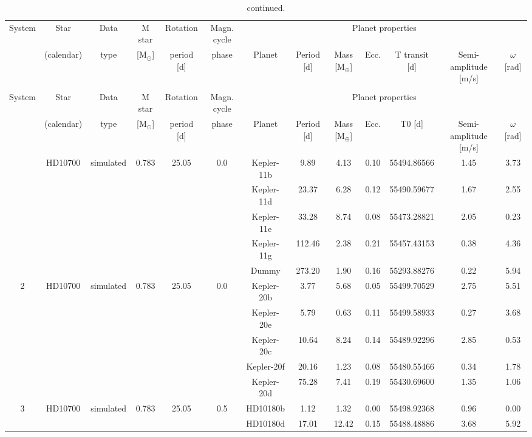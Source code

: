 \documentclass{article}
\begin{document}
	
\begin{landscape}

\begin{longtable}{ccccccccccccc}
\caption{\label{data} Properties of the data set of the  RV fitting challenge.}\\
\hline\hline
System & Star & Data & M star & Rotation & Magn. cycle & \multicolumn{7}{c}{Planet properties} \\
 & (calendar) & type & [M$_{\odot}$] & period [d] & phase & Planet & Period [d] & Mass [M$_{\oplus}$] & Ecc. & T transit [d] & Semi-amplitude [m/s] & $\omega$ [rad]  \\
\hline
\endfirsthead
\caption{continued.}\\
\hline\hline
System  & Star & Data & M star & Rotation & Magn. cycle & \multicolumn{7}{c}{Planet properties} \\
 & (calendar) & type & [M$_{\odot}$] & period [d] & phase & Planet & Period [d] & Mass [M$_{\oplus}$] & Ecc. & T0 [d] & Semi-amplitude [m/s] & $\omega$ [rad]  \\
\hline
\endhead
\hline
\endfoot
1 & HD10700 & simulated & 0.783 & 25.05 & 0.0 & Kepler-11b & 9.89 & 4.13 & 0.10 & 55494.86566 & 1.45 & 3.73 \\
 & & & &  & & Kepler-11d & 23.37 & 6.28 & 0.12 & 55490.59677 & 1.67 & 2.55 \\
 & & & &  & & Kepler-11e & 33.28 & 8.74 & 0.08 & 55473.28821 & 2.05 & 0.23 \\
 & & & &  & & Kepler-11g & 112.46 & 2.38 & 0.21 & 55457.43153 & 0.38 & 4.36 \\
 & & & &  & & Dummy & 273.20 & 1.90 & 0.16 & 55293.88276 & 0.22 & 5.94 \\
\hline
2 & HD10700 & simulated & 0.783 & 25.05 & 0.0 & Kepler-20b & 3.77 & 5.68 & 0.05 & 55499.70529 & 2.75 & 5.51 \\
 & & & &  & & Kepler-20e & 5.79 & 0.63 & 0.11 & 55499.58933 & 0.27 & 3.68 \\
 & & & &  & & Kepler-20c & 10.64 & 8.24 & 0.14 & 55489.92296 & 2.85 & 0.53 \\
 & & & &  & & Kepler-20f & 20.16 & 1.23 & 0.08 & 55480.55466 & 0.34 & 1.78 \\
 & & & &  & & Kepler-20d & 75.28 & 7.41 & 0.19 & 55430.69600 & 1.35 & 1.06 \\
\hline
3 & HD10700 & simulated & 0.783 & 25.05 & 0.5 & HD10180b & 1.12 & 1.32 & 0.00 & 55498.92368 & 0.96 & 0.00 \\
 & & & &  & & HD10180d & 17.01 & 12.42 & 0.15 & 55488.48886 & 3.68 & 5.92 \\

\end{longtable}
\end{landscape}
\end{document}
